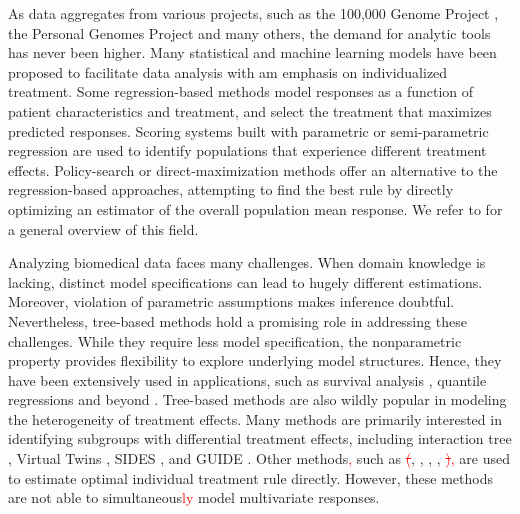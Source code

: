 \documentclass[smallextended]{svjour3}
\newcommand{\bg}[1]{\textcolor{red}{#1}}
\begin{document}
As data aggregates from various projects, such as the 100,000 Genome Project \citep{Peplowi1757}, the Personal Genomes Project \citep{ball2014harvard} and many others, the demand for analytic tools has never been higher. Many statistical and machine learning models have been proposed to facilitate data analysis with am emphasis on individualized treatment. Some regression-based methods \citep{Brinkley2010,qian2011performance} model responses as a function of patient characteristics and treatment, and select the treatment that maximizes predicted responses. Scoring systems built with parametric or semi-parametric regression\citep{Cai2011, Zhao2013} are used to identify populations that experience different treatment effects. Policy-search or direct-maximization methods \citep{Zhang2012,zhang2012robust, Zhao2012, Zhang2013} offer an alternative to the regression-based approaches, attempting to find the best rule by directly optimizing an estimator of the overall population mean response. We refer to \citep{kosorok2015adaptive} for a general overview of this field. 

Analyzing biomedical data faces many challenges. When domain knowledge is lacking, distinct model specifications can lead to hugely different estimations. Moreover, violation of parametric assumptions makes inference doubtful. Nevertheless, tree-based methods hold a promising role in addressing these challenges. While they require less model specification, the nonparametric property provides flexibility to explore underlying model structures. Hence, they have been extensively used in applications, such as survival analysis \citep{gordon1985tree, leblanc1992relative, hothorn2005survival, ishwaran2008random, zhu2012recursively}, quantile regressions \citep{meinshausen2006quantile} and beyond \citep{athey2019generalized}. Tree-based methods are also wildly popular in modeling the heterogeneity of treatment effects. Many methods are primarily interested in identifying subgroups with differential treatment effects, including interaction tree \citep{Su2009}, Virtual Twins \citep{Foster2011a}, SIDES \citep{Lipkovich2011}, and GUIDE \citep{Loh2015}. Other methods\bg{,} such as \bg{\st{(}}\cite{Zhang2012}, \cite{Laber2015a}, \cite{Zhang2015a}, \cite{athey2016recursive}, \cite{Zhu2017}\bg{\st{)},} are used to estimate optimal individual treatment rule directly. However, these methods are not able to simultaneous\bg{ly} model multivariate responses.
\end{document}
